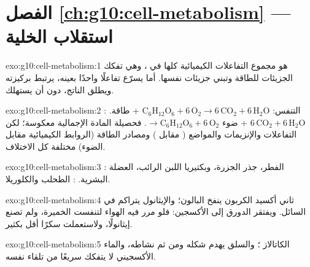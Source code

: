 \section*{الفصل \ref{ch:g10:cell-metabolism} --- استقلاب الخلية}

\begin{solution}{exo:g10:cell-metabolism:1}
 هو مجموع التفاعلات الكيميائية كلها في ، وهي تفكك
الجزيئات للطاقة وتبني جزيئات  نفسها. أما   يسرّع
تفاعلًا واحدًا بعينه، يرتبط بركيزته ويطلق الناتج، دون أن يستهلك.
\end{solution}

\begin{solution}{exo:g10:cell-metabolism:2}
التنفس: $\mathrm{C_6H_{12}O_6} + 6\,\mathrm{O_2} \to
6\,\mathrm{CO_2} + 6\,\mathrm{H_2O}$ + طاقة. :
$6\,\mathrm{CO_2} + 6\,\mathrm{H_2O}$ + ضوء $\to \mathrm{C_6H_{12}O_6}
+ 6\,\mathrm{O_2}$. فحصيلة المادة الإجمالية معكوسة؛ لكن التفاعلات
والإنزيمات والمواضع ( مقابل ) ومصادر الطاقة
(الروابط الكيميائية مقابل الضوء) مختلفة كل الاختلاف.
\end{solution}

\begin{solution}{exo:g10:cell-metabolism:3}
: الفطر،  جذر الجزرة، وبكتيريا اللبن الرائب،
 العضلة البشرية. : الطحلب والكلوريلا.
\end{solution}

\begin{solution}{exo:g10:cell-metabolism:4}
ثاني أكسيد الكربون ينفخ البالون؛ والإيثانول يتراكم في السائل. ويفتقر
الدورق إلى الأكسجين: فلو مرر فيه الهواء لتنفست الخميرة، ولم تصنع
إيثانولًا، ولاستعملت سكرًا أقل بكثير.
\end{solution}

\begin{solution}{exo:g10:cell-metabolism:5}
الكاتالاز ؛ والسلق يهدم شكله ومن ثم نشاطه، والماء الأكسجيني لا
يتفكك سريعًا من تلقاء نفسه.
\end{solution}


